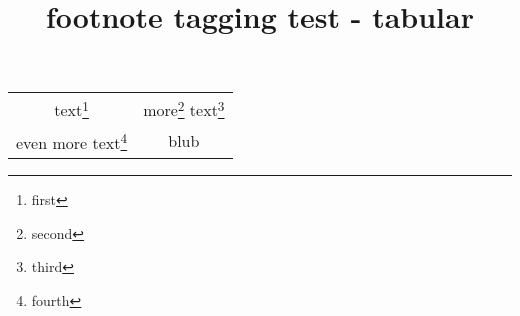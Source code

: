 \documentclass{article}
\title{footnote tagging test - tabular}
\begin{document}
\begin{savenotes}
\begin{tabular}{cc}
text\footnote{first} & more\footnote{second} text\footnote{third} \\
even more text\footnote{fourth} & blub
\end{tabular}
\end{savenotes}
\end{document}
